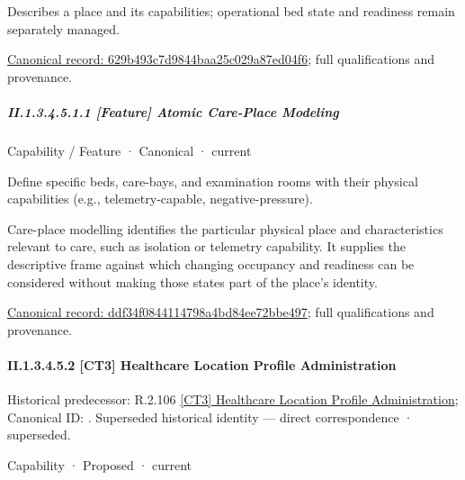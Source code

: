 Describes a place and its capabilities; operational bed state and readiness remain separately managed.


{\footnotesize \href{../../../../../../../continuum/strategy/capability/629b493c7d9844baa25c029a87ed04f6.md}{Canonical record: 629b493c7d9844baa25c029a87ed04f6}; full qualifications and provenance.}\par
\subparagraph*{II.1.3.4.5.1.1 [Feature] Atomic Care-Place Modeling}
\label{navigation:II.1.3.4.5.1.1}

\label{element:ddf34f0844114798a4bd84ee72bbe497}
{\small Capability / Feature · Canonical · current}\par

Define specific beds, care-bays, and examination rooms with their physical capabilities (e.g., telemetry-capable, negative-pressure).



Care-place modelling identifies the particular physical place and characteristics relevant to care, such as isolation or telemetry capability. It supplies the descriptive frame against which changing occupancy and readiness can be considered without making those states part of the place's identity.


{\footnotesize \href{../../../../../../../continuum/strategy/capability/feature/ddf34f0844114798a4bd84ee72bbe497.md}{Canonical record: ddf34f0844114798a4bd84ee72bbe497}; full qualifications and provenance.}\par
\paragraph*{II.1.3.4.5.2 [CT3] Healthcare Location Profile Administration}
\label{navigation:II.1.3.4.5.2}

{\small Historical predecessor: R.2.106 \hyperref[element:8a04d1f16d0849e786d2aaec33e0ba87]{[CT3] Healthcare Location Profile Administration}; Canonical ID: \texttt{}. Superseded historical identity — direct correspondence · superseded.}\par
\label{element:e579e54a08bb4f899a504aa998ba246b}
{\small Capability · Proposed · current}\par

